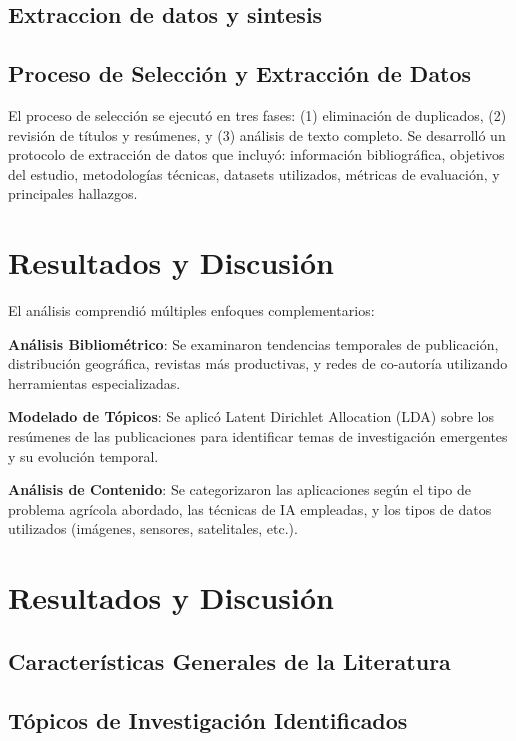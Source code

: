 \documentclass[12pt,a4paper]{article}
\begin{document}
\subsection{Extraccion de datos y sintesis}

\subsection{Proceso de Selección y Extracción de Datos}

El proceso de selección se ejecutó en tres fases: (1) eliminación de duplicados, (2) revisión de títulos y resúmenes, y (3) análisis de texto completo. Se desarrolló un protocolo de extracción de datos que incluyó: información bibliográfica, objetivos del estudio, metodologías técnicas, datasets utilizados, métricas de evaluación, y principales hallazgos.

\section{Resultados y Discusión}

El análisis comprendió múltiples enfoques complementarios:

\textbf{Análisis Bibliométrico}: Se examinaron tendencias temporales de publicación, distribución geográfica, revistas más productivas, y redes de co-autoría utilizando herramientas especializadas.

\textbf{Modelado de Tópicos}: Se aplicó Latent Dirichlet Allocation (LDA) sobre los resúmenes de las publicaciones para identificar temas de investigación emergentes y su evolución temporal.

\textbf{Análisis de Contenido}: Se categorizaron las aplicaciones según el tipo de problema agrícola abordado, las técnicas de IA empleadas, y los tipos de datos utilizados (imágenes, sensores, satelitales, etc.).

\section{Resultados y Discusión}

\subsection{Características Generales de la Literatura}


\subsection{Tópicos de Investigación Identificados}
\end{document}
